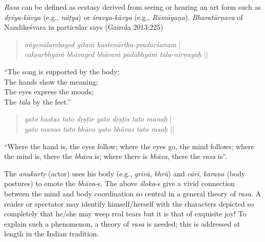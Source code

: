 \textsl{Rasa} can be defined as ecstasy derived from seeing or hearing an art form such as \textsl{dṛśya-kāvya} (e.g., \textsl{nāṭya}) or \textsl{śravya-kāvya} (e.g., \textsl{Rāmāyaṇa}). \textsl{Bharatārṇava} of Nandikeśvara in particular says (Gairola 2013:225)
\begin{quote}
\textsl{aṅgenālambayed gītaṁ hastenārtha-pradarśanam} |\\[2pt]
\textsl{cakṣurbhyāṁ bhāvayed bhāvaṁ pādābhyāṁ tāla-nirṇayaḥ} ||
\end{quote}
``The song is supported by the body;\\[1pt]
The hands show the meaning;\\[1pt]
The eyes express the moods;\\[1pt]
The \textsl{tāla} by the feet.''
\begin{quote}
\textsl{yato hastas tato dṛṣṭir yato dṛṣṭis tato manaḥ} |\\[2pt]
\textsl{yato manas tato bhāvo yato bhāvas tato rasaḥ} ||
\end{quote}

``Where the hand is, the eyes follow; where the eyes go, the mind follows; where the mind is, there the \textsl{bhāva} is; where there is \textsl{bhāva}, there the \textsl{rasa} is”.

The \textsl{anukartṛ} (actor) uses his body (e.g., \textsl{grīvā}, \textsl{bhrū}) and \textsl{cāri}, \textsl{karaṇa} (body postures) to emote the \textsl{bhāva}-s. The above \textsl{śloka}-s give a vivid connection between the mind and body coordination so central in a general theory of \textsl{rasa}. A reader or spectator may identify himself/herself with the characters depicted so completely that he/she may weep real tears but it is that of exquisite joy! To explain such a phenomenon, a theory of \textsl{rasa} is needed; this is addressed at length in the Indian tradition. 

